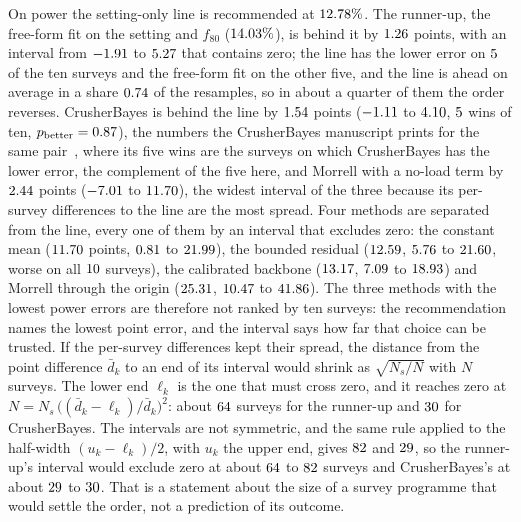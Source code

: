 \begin{table}[!htbp]
\centering
\caption{Paired differences of the held-out MAPE of every two predictors on the ten HP500 surveys, for throughput and for power: each cell is
the $95\%$ bootstrap interval, in points, of the MAPE of the row's predictor minus that of the column's, on the $\uqB$ resamples of
Table~\ref{tab:uncertainty}; intervals that exclude zero are in bold. Generated from \texttt{loo.json} and \texttt{crusherbayes.json}
through \texttt{heldout\_uq.py}.}
\label{tab:pairs}
\scriptsize
\setlength{\tabcolsep}{2pt}
\resizebox{\textwidth}{!}{}
\end{table}

On power the setting-only line is recommended at $12.78\%$. The runner-up, the free-form fit on the setting and $f_{80}$
($14.03\%$), is behind it by $1.26$ points, with an interval from $-1.91$ to $5.27$ that contains zero; the
line has the lower error on $5$ of the ten surveys and the free-form fit on the other five, and the line is ahead on
average in a share $0.74$ of the resamples, so in about a quarter of them the order reverses. CrusherBayes is behind the line by
$1.54$ points ($-1.11$ to $4.10$, $5$ wins of ten, $p_{\mathrm{better}}=0.87$), the numbers the CrusherBayes
manuscript prints for the same pair~\cite{crusherbayes2026}, where its five wins are the surveys on which CrusherBayes has the lower
error, the complement of the five here, and Morrell with a no-load term by
$2.44$ points ($-7.01$ to $11.70$), the widest interval of the three because its per-survey differences to the
line are the most spread. Four methods are separated from the line, every one of them by an interval that excludes zero:
the constant mean ($11.70$ points, $0.81$ to $21.99$), the bounded residual ($12.59$, $5.76$ to
$21.60$, worse on all $10$ surveys), the calibrated backbone ($13.17$, $7.09$ to $18.93$) and Morrell
through the origin ($25.31$, $10.47$ to $41.86$). The three methods with the lowest power errors are therefore not ranked
by ten surveys: the recommendation names the lowest point error, and the interval says how far that choice can be trusted. If the
per-survey differences kept their spread, the distance from the point difference $\bar d_k$ to an end of its interval would shrink
as $\sqrt{N_s/N}$ with $N$ surveys. The lower end $\ell_k$ is the one that must cross zero, and it reaches zero at
$N=N_s\,\big((\bar d_k-\ell_k)/\bar d_k\big)^2$: about $64$ surveys for the runner-up and $30$ for
CrusherBayes. The intervals are not symmetric, and the same rule applied to the half-width $(u_k-\ell_k)/2$, with $u_k$ the upper end,
gives $82$ and $29$, so the runner-up's interval would exclude zero at about $64$ to
$82$ surveys and CrusherBayes's at about $29$ to $30$. That is a statement about the size of a
survey programme that would settle the order, not a prediction of its outcome.

